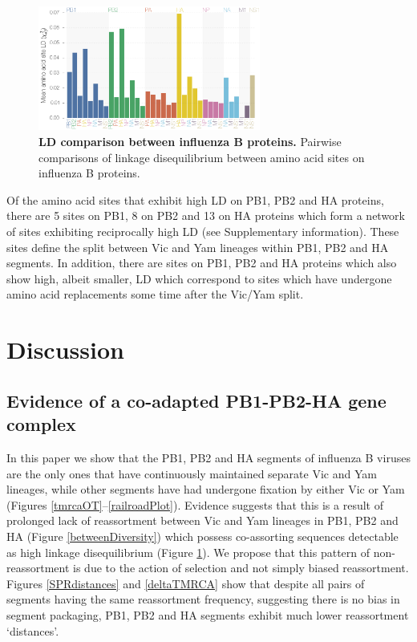 \documentclass[11pt,oneside,letterpaper]{article}
\begin{document}
\begin{figure}[h]
	\centering	
	\includegraphics[width=0.65\textwidth]{figures/InfB_aaMeanLD.png}
	\caption{\textbf{LD comparison between influenza B proteins.}
Pairwise comparisons of linkage disequilibrium between amino acid sites on influenza B proteins.}
	\label{segmentLD}
\end{figure}

Of the amino acid sites that exhibit high LD on PB1, PB2 and HA proteins, there are 5 sites on PB1, 8 on PB2 and 13 on HA proteins which form a network of sites exhibiting reciprocally high LD (see Supplementary information).
These sites define the split between Vic and Yam lineages within PB1, PB2 and HA segments.
In addition, there are sites on PB1, PB2 and HA proteins which also show high, albeit smaller, LD which correspond to sites which have undergone amino acid replacements some time after the Vic/Yam split.

\section*{Discussion}

\subsection*{Evidence of a co-adapted PB1-PB2-HA gene complex}
In this paper we show that the PB1, PB2 and HA segments of influenza B viruses are the only ones that have continuously maintained separate Vic and Yam lineages, while other segments have had undergone fixation by either Vic or Yam (Figures \ref{tmrcaOT}--\ref{railroadPlot}).
Evidence suggests that this is a result of prolonged lack of reassortment between Vic and Yam lineages in PB1, PB2 and HA (Figure \ref{betweenDiversity}) which possess co-assorting sequences detectable as high linkage disequilibrium (Figure \ref{segmentLD}).
We propose that this pattern of non-reassortment is due to the action of selection and not simply biased reassortment.
Figures \ref{SPRdistances} and \ref{deltaTMRCA} show that despite all pairs of segments having the same reassortment frequency, suggesting there is no bias in segment packaging, PB1, PB2 and HA segments exhibit much lower reassortment `distances'.
\end{document}
